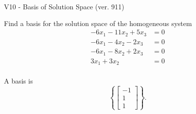 \begin{exercise}
  \begin{exerciseTitle}V10 - Basis of Solution Space (ver. 911)\end{exerciseTitle}
  \begin{exerciseStatement}
    Find a basis for the solution space of the homogeneous system 
\begin{align*}
 -6 x_ 1 -11 x_ 2 + 5 x_ 3 &= 0  \\ 
  -6 x_ 1 -4 x_ 2 -2 x_ 3 &= 0  \\ 
  -6 x_ 1 -8 x_ 2 + 2 x_ 3 &= 0  \\ 
  3 x_ 1 + 3 x_ 2 &= 0  \\ 
 \end{align*}


 
  \end{exerciseStatement}

  \begin{exerciseAnswer}
   A basis is   
\[\left\{\left[\begin{array}{c}
-1 \\
1 \\
1
\end{array}\right]\right\}.\]

  


  \end{exerciseAnswer}
\end{exercise}